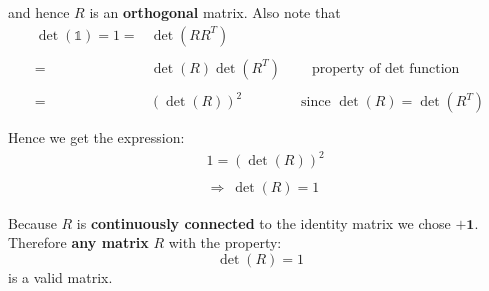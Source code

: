and hence $R$ is an {\bf orthogonal} matrix. Also note that
$$\begin{aligned}\det(\mathbb{1}) = 1 = & \det(RR^{T})                                                                            \\ \\
               =                      & \det(R)\det(R^{T}) \ \ \ \ \ \ \ \ \ \ \text{property of det function}                  \\ \\
               =                      & (\det(R))^{2} \ \ \ \ \ \ \ \ \ \ \ \ \ \ \ \ \ \ \ \text{since } \det(R) = \det(R^{T}) \\ \\\end{aligned} $$
Hence we get the expression:
$$\begin{aligned}  & 1 = (\det(R))^{2}          \\ \\
                 & \Rightarrow  \ \det(R) = 1\end{aligned}$$

Because $R$ is {\bf continuously connected} to the identity matrix we chose $\boldsymbol{+1}$.
Therefore {\bf any matrix} $R$ with the property:
$$\det(R) = 1$$
is a valid matrix.
